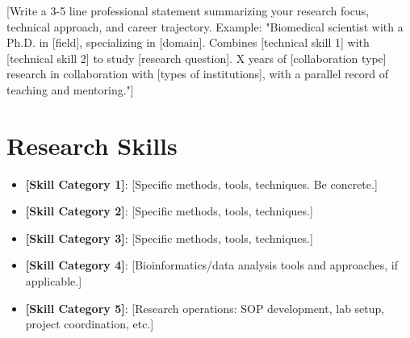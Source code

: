 \documentclass[11pt,letterpaper,sans]{moderncv}
\begin{document}
\makecvtitle


\vspace{6pt}
\small{[Write a 3-5 line professional statement summarizing your research focus, technical approach, and career trajectory. Example: "Biomedical scientist with a Ph.D. in [field], specializing in [domain]. Combines [technical skill 1] with [technical skill 2] to study [research question]. X years of [collaboration type] research in collaboration with [types of institutions], with a parallel record of teaching and mentoring."]}


\section{Research Skills}
\vspace{1pt}
\begin{itemize}

\item \textbf{[Skill Category 1]}: [Specific methods, tools, techniques. Be concrete.]

\item \textbf{[Skill Category 2]}: [Specific methods, tools, techniques.]

\item \textbf{[Skill Category 3]}: [Specific methods, tools, techniques.]

\item \textbf{[Skill Category 4]}: [Bioinformatics/data analysis tools and approaches, if applicable.]

\item \textbf{[Skill Category 5]}: [Research operations: SOP development, lab setup, project coordination, etc.]

\end{itemize}


\end{document}
